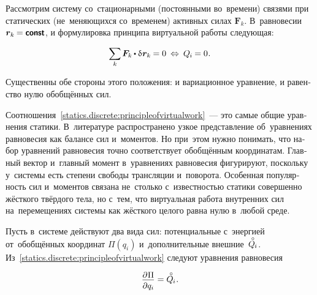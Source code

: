 \label{para:statics}

\begin{otherlanguage}{russian}

Рассмотрим систему со~стационарными (постоянными во~времени) связями при статических (не~меняющихся со~временем) активных силах ${\bm{F}_k}$. В~равновесии ${\bm{r}_k \hspace{-0.12ex} = \boldconst}$, и формулировка принципа виртуальной работы следующая:

\nopagebreak\vspace{-0.1em}\begin{equation}\label{statics.discrete:principleofvirtualwork}
\displaystyle \sum_{\smash{k}} \hspace{-0.1ex} \bm{F}_k \hspace{-0.1ex} \dotp \variation{\hspace{.1ex}\bm{r}_k} \hspace{-0.1ex} = 0
\:\Leftrightarrow\:
Q_{\hspace{-0.1ex}i} \hspace{-0.1ex} = 0 \hspace{.1ex} .
\vspace{-0.1em}\end{equation}

\vspace{-0.2em} \noindent Существенны обе стороны этого положения: и вариационное уравнение, и равенство нулю обобщённых сил.

Соотношения~\eqref{statics.discrete:principleofvirtualwork}~--- это самые общие уравнения статики. В~литературе распространено узкое представление об~уравнениях равновесия как балансе сил и~моментов. Но при~этом нужно понимать, что набор уравнений равновесия точно соответствует обобщённым координатам. Главный вектор и~главный момент в~уравнениях равновесия фигурируют, поскольку у~системы есть степени свободы трансляции и~поворота. Особенная популярность сил и~моментов связана не~столько с~известностью статики совершенно жёсткого твёрдого тела, но с~тем, что виртуальная работа внутренних сил на~перемещениях системы как жёсткого целого равна нулю в~любой среде.

Пусть в~системе действуют два вида сил: потенциальные с~энергией от~обобщённых координат ${\Pi(q_i)}$ и~дополнительные внешние~${\mathcircabove{Q}_{\hspace{-0.1ex}i}}$. Из~\eqref{statics.discrete:principleofvirtualwork} следуют уравнения равновесия

\nopagebreak\vspace{-0.1em}\begin{equation}\label{staticequilibriumwithpotentialenergy}
\scalebox{0.96}{$ \displaystyle \frac{\raisemath{-0.15em}{\partial \hspace{.1ex} \Pi}}{\raisemath{-0.1em}{\partial q_i}} $} = \mathcircabove{Q}_{\hspace{-0.1ex}i} \hspace{.1ex} .
\end{equation}


\end{otherlanguage}
